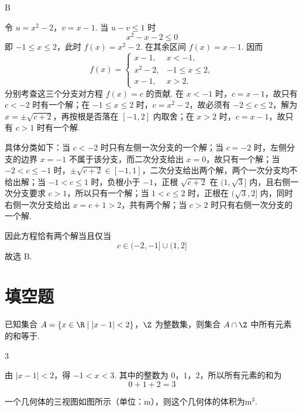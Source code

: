 \begin{answer}
B
\end{answer}

\begin{solution}
令 \(u=x^2-2\)，\(v=x-1\). 当 \(u-v\leqslant1\) 时
\[
x^2-x-2\leqslant0
\]
即 \(-1\leqslant x\leqslant2\)，此时 \(f(x)=x^2-2\). 在其余区间 \(f(x)=x-1\). 因而
\[
f(x)=
\begin{cases}
x-1,&x<-1,\\
x^2-2,&-1\leqslant x\leqslant2,\\
x-1,&x>2.
\end{cases}
\]
分别考查这三个分支对方程 \(f(x)=c\) 的贡献. 在 \(x<-1\) 时，\(c=x-1\)，故只有 \(c<-2\) 时有一个解；在 \(-1\leqslant x\leqslant2\) 时，\(c=x^2-2\)，故必须有 \(-2\leqslant c\leqslant2\)，解为 \(x=\pm\sqrt{c+2}\)，再按根是否落在 \([-1,2]\) 内取舍；在 \(x>2\) 时，\(c=x-1\)，故只有 \(c>1\) 时有一个解.

具体分类如下：当 \(c<-2\) 时只有左侧一次分支的一个解；当 \(c=-2\) 时，左侧分支的边界 \(x=-1\) 不属于该分支，而二次分支给出 \(x=0\)，故只有一个解；当 \(-2<c\leqslant-1\) 时，\(\pm\sqrt{c+2}\in[-1,1]\)，二次分支给出两个解，两个一次分支均不给出解；当 \(-1<c\leqslant1\) 时，负根小于 \(-1\)，正根 \(\sqrt{c+2}\) 在 \((1,\sqrt3]\) 内，且右侧一次分支要求 \(c>1\)，所以只有一个解；当 \(1<c\leqslant2\) 时，正根在 \((\sqrt3,2]\) 内，同时右侧一次分支给出 \(x=c+1>2\)，共有两个解；当 \(c>2\) 时只有右侧一次分支的一个解.

因此方程恰有两个解当且仅当
\[
c\in(-2,-1]\cup(1,2]
\]
故选 B.
\end{solution}

\section{填空题}

\begin{problem}
已知集合 \(A = \{x \in \R \mid |x - 1| < 2\}\)，\(\Z\) 为整数集，则集合 \(A \cap \Z\) 中所有元素的和等于\fillinblank{}.
\end{problem}

\begin{answer}
3
\end{answer}

\begin{solution}
由 \(\lvert x-1\rvert<2\)，得 \(-1<x<3\). 其中的整数为 \(0\)，\(1\)，\(2\)，所以所有元素的和为
\[
0+1+2=3
\]
\end{solution}

\begin{problem}
一个几何体的三视图如图所示（单位：m），则这个几何体的体积为\fillinblank{}\(\mathrm{m}^{3}\).

\end{problem}

